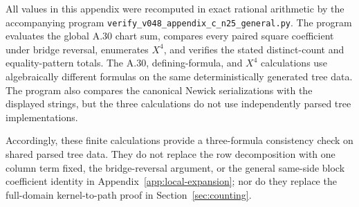 All values in this appendix were recomputed in exact rational arithmetic by
the accompanying program \texttt{verify\_v048\_appendix\_c\_n25\_general.py}.
The program evaluates the global A.30 chart sum, compares every paired square
coefficient under bridge reversal, enumerates $X^4$, and verifies the stated
distinct-count and equality-pattern totals.  The A.30, defining-formula, and
$X^4$ calculations use algebraically different formulas on the same
deterministically generated tree data.  The program also compares the
canonical Newick serializations with the displayed strings, but the three
calculations do not use independently parsed tree implementations.

Accordingly, these finite calculations provide a three-formula consistency
check on shared parsed tree data.  They do not replace the row decomposition
with one column term fixed, the bridge-reversal argument, or the general
same-side block coefficient identity in
Appendix~\ref{app:local-expansion}; nor do they replace the full-domain
kernel-to-path proof in Section~\ref{sec:counting}.
